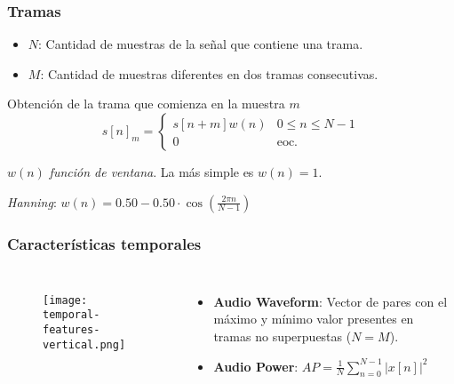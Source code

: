 \begin{frame}
    \frametitle{Tramas}

    \begin{itemize}
        \item $N$: Cantidad de muestras de la señal que contiene una trama.
        \item $M$: Cantidad de muestras diferentes en dos tramas consecutivas.
    \end{itemize}

    \pause
    \begin{block}{Obtención de la trama que comienza en la muestra $m$}
        \begin{equation*}
            s[n]_m = \begin{cases}
                         s[n + m]w(n) & 0\leq n\leq N-1 \\
                         0 & \text{eoc.}
            \end{cases}
        \end{equation*}
    \end{block}

    $w(n)$ \textit{función de ventana}. La más simple es $w(n)=1$.

    \pause
    \alert{\textit{Hanning}: $w(n) = 0.50 - 0.50 \cdot \cos \left( \frac{2\pi n}{N-1} \right)$}
\end{frame}

\begin{frame}
    \frametitle{Características temporales}

    \begin{columns}

        \begin{figure}[!h]
            \centering
            \texttt{[image: temporal-features-vertical.png]}
        \end{figure}


        \begin{itemize}
            \item<2-> \textbf{Audio Waveform}: Vector de pares con el máximo y mínimo valor presentes en tramas no superpuestas ($N=M$).
            \item<3-> \textbf{Audio Power}: $AP = \frac{1}{N}\sum_{n=0}^{N-1}{|x[n]|^2}$
        \end{itemize}

    \end{columns}
\end{frame}

